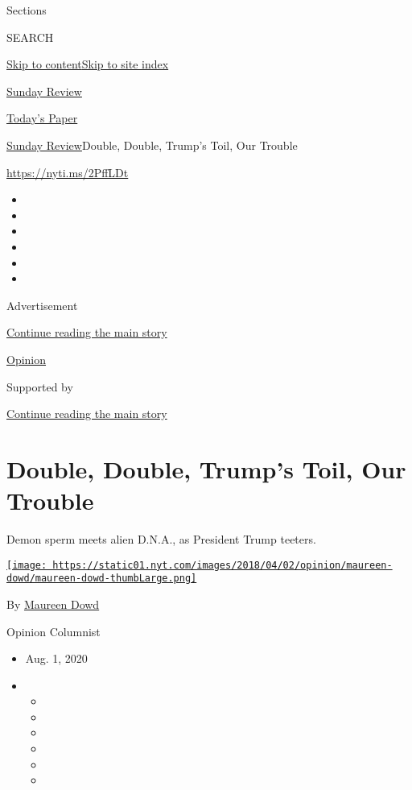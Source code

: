 Sections

SEARCH

\protect\hyperlink{site-content}{Skip to
content}\protect\hyperlink{site-index}{Skip to site index}

\href{https://www.nytimes.com/section/opinion/sunday}{Sunday Review}

\href{https://myaccount.nytimes.com/auth/login?response_type=cookie\&client_id=vi}{}

\href{https://www.nytimes.com/section/todayspaper}{Today's Paper}

\href{/section/opinion/sunday}{Sunday Review}\textbar{}Double, Double,
Trump's Toil, Our Trouble

\href{https://nyti.ms/2PffLDt}{https://nyti.ms/2PffLDt}

\begin{itemize}
\item
\item
\item
\item
\item
\item
\end{itemize}

Advertisement

\protect\hyperlink{after-top}{Continue reading the main story}

\href{/section/opinion}{Opinion}

Supported by

\protect\hyperlink{after-sponsor}{Continue reading the main story}

\hypertarget{double-double-trumps-toil-our-trouble}{%
\section{Double, Double, Trump's Toil, Our
Trouble}\label{double-double-trumps-toil-our-trouble}}

Demon sperm meets alien D.N.A., as President Trump teeters.

\href{https://www.nytimes.com/by/maureen-dowd}{\texttt{[image: https://static01.nyt.com/images/2018/04/02/opinion/maureen-dowd/maureen-dowd-thumbLarge.png]}}

By \href{https://www.nytimes.com/by/maureen-dowd}{Maureen Dowd}

Opinion Columnist

\begin{itemize}
\item
  Aug. 1, 2020
\item
  \begin{itemize}
  \item
  \item
  \item
  \item
  \item
  \item
  \end{itemize}
\end{itemize}

